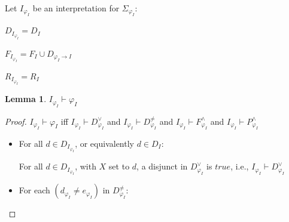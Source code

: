 \documentclass[letterpaper]{article}
\newenvironment{packed_itemize}{
\vspace*{-0.2em}
\begin{itemize}
\setlength{\partopsep}{0pt}
\setlength{\itemsep}{1pt}
\setlength{\parskip}{0pt}
\setlength{\parsep}{0pt}
}{\end{itemize}}
\newtheorem*{lemma}{Lemma}
\newcommand{\true}{{\mathit{true}}}
\begin{document}
\noindent
Let $I_{\varphi_I}$ be an interpretation for $\Sigma_{\varphi_I}$:
\begin{packed_itemize}
\item $D_{I_{\varphi_I}} = D_I$
\item $F_{I_{\varphi_I}} = F_I \cup D_{\varphi_I \rightarrow I}$
\item $R_{I_{\varphi_I}} = R_I$
\end{packed_itemize}

\begin{lemma} 
$I_{\varphi_I} \vdash \varphi_I$
\end{lemma}
\vspace*{-1em}
\begin{proof}
$I_{\varphi_I} \vdash \varphi_I$ iff 
$I_{\varphi_I} \vdash D^\vee_{\varphi_I}$ and
$I_{\varphi_I} \vdash D^{\neq}_{\varphi_I}$ and
$I_{\varphi_I} \vdash F^\wedge_{\varphi_I}$ and
$I_{\varphi_I} \vdash P^\wedge_{\varphi_I}$
\begin{itemize}
\item For all $d \in D_{I_{\varphi_I}}$, or equivalently $d \in D_I$:
      For all $d \in D_{I_{\varphi_I}}$, with $X$ set to $d$, a disjunct in $D^\vee_{\varphi_I}$ 
      is $\true$, i.e., $I_{\varphi_I} \vdash D^\vee_{\varphi_I}$
\item For each $(d_{\varphi_I} \neq e_{\varphi_I})$ in $D^{\neq}_{\varphi_I}$:
\end{itemize}
\end{proof}
\end{document}
